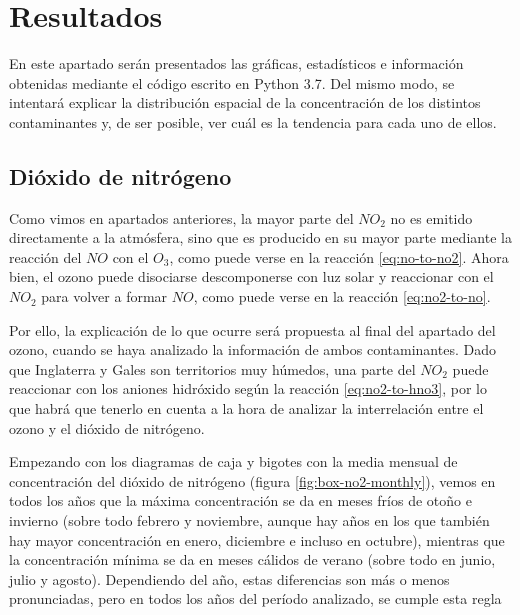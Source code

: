 \documentclass[12pt]{article}
\begin{document}
\newpage

\section{Resultados}

En este apartado serán presentados las gráficas, estadísticos e información obtenidas mediante el código escrito en Python 3.7. Del mismo modo, se intentará explicar la distribución espacial de la concentración de los distintos contaminantes y, de ser posible, ver cuál es la tendencia para cada uno de ellos.

\subsection{Dióxido de nitrógeno}

Como vimos en apartados anteriores, la mayor parte del $NO_{2}$ no es emitido directamente a la atmósfera, sino que es producido en su mayor parte mediante la reacción del $NO$ con el $O_{3}$, como puede verse en la reacción \ref{eq:no-to-no2}. Ahora bien, el ozono puede disociarse descomponerse con luz solar y reaccionar con el $NO_{2}$ para volver a formar $NO$, como puede verse en la reacción \ref{eq:no2-to-no}.

Por ello, la explicación de lo que ocurre será propuesta al final del apartado del ozono, cuando se haya analizado la información de ambos contaminantes. Dado que Inglaterra y Gales son territorios muy húmedos, una parte del $NO_{2}$ puede reaccionar con los aniones hidróxido según la reacción \ref{eq:no2-to-hno3}, por lo que habrá que tenerlo en cuenta a la hora de analizar la interrelación entre el ozono y el dióxido de nitrógeno.

Empezando con los diagramas de caja y bigotes con la media mensual de concentración del dióxido de nitrógeno (figura \ref{fig:box-no2-monthly}), vemos en todos los años que la máxima concentración se da en meses fríos de otoño e invierno (sobre todo febrero y noviembre, aunque hay años en los que también hay mayor concentración en enero, diciembre e incluso en octubre), mientras que la concentración mínima se da en meses cálidos de verano (sobre todo en junio, julio y agosto). Dependiendo del año, estas diferencias son más o menos pronunciadas, pero en todos los años del período analizado, se cumple esta regla
\end{document}
